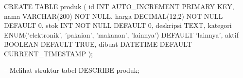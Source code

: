 \begin{webcode}[language=SQL, caption={Membuat tabel dengan berbagai tipe data dan constraint}]
CREATE TABLE produk (
  id        INT AUTO_INCREMENT PRIMARY KEY,
  nama      VARCHAR(200) NOT NULL,
  harga     DECIMAL(12,2) NOT NULL DEFAULT 0,
  stok      INT NOT NULL DEFAULT 0,
  deskripsi TEXT,
  kategori  ENUM('elektronik', 'pakaian', 'makanan', 'lainnya')
              DEFAULT 'lainnya',
  aktif     BOOLEAN DEFAULT TRUE,
  dibuat    DATETIME DEFAULT CURRENT_TIMESTAMP
);

-- Melihat struktur tabel
DESCRIBE produk;
\end{webcode}

